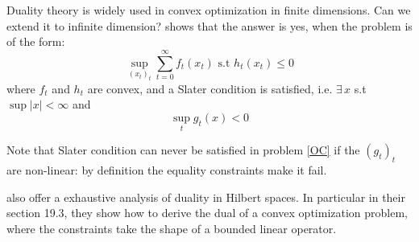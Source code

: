 \documentclass[12pt]{article}
\begin{document}
Duality theory is widely used in convex optimization in finite dimensions. Can we extend it to infinite dimension? \cite{dechertLagrangeMultipliersInfinite1982} shows that the answer is yes, when the problem is of the form:
\begin{equation} \label{prob_ineq}
  \sup_{(x_t)_t} \sum_{t=0}^{\infty} f_t(x_t) \text{ s.t }h_t(x_t) \leq 0
\end{equation}
where $f_t$ and $h_t$ are convex, and a Slater condition is satisfied, i.e. $\exists \,x$ s.t $\sup |x| < \infty$ and
\begin{equation}
  \sup_t g_t(x) < 0
\end{equation}

Note that Slater condition can never be satisfied in problem \eqref{OC} if the $(g_t)_t$ are non-linear: by definition the equality constraints make it fail. 


\bigskip

\cite{combettesConvexAnalysisMonotone2017} also offer a exhaustive analysis of duality in Hilbert spaces. In particular in their section 19.3, they show how to derive the dual of a convex optimization problem, where the constraints take the shape of a bounded linear operator.


\newpage

\end{document}
